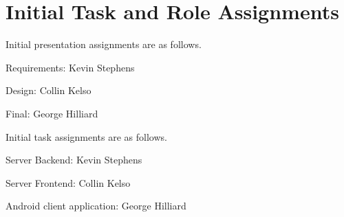 \documentclass[11pt]{scrartcl}
\let\stdsection\section
\renewcommand\section{\newpage\stdsection}
\begin{document}
\section{Initial Task and Role Assignments}
    Initial presentation assignments are as follows.
    \begin{description*}
        \item[Requirements:] Kevin Stephens
        \item[Design:] Collin Kelso
        \item[Final:] George Hilliard
    \end{description*}

    Initial task assignments are as follows.
    \begin{description*}
        \item[Server Backend:] Kevin Stephens
        \item[Server Frontend:] Collin Kelso
        \item[Android client application:] George Hilliard
    \end{description*}
\end{document}
